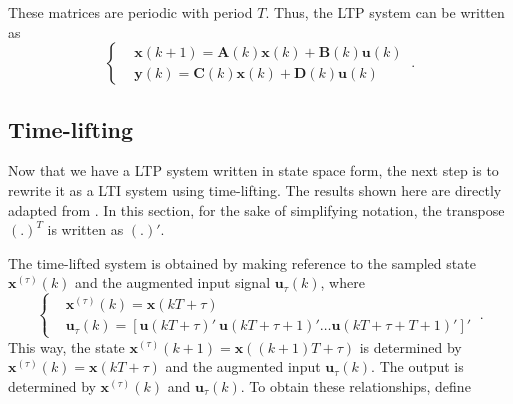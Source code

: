 These matrices are periodic with period $T$. Thus, the LTP system can be written as
\begin{equation} \label{eq:4.4}
\begin{cases}
      &\boldsymbol{x}(k+1)=\boldsymbol{A}(k)\boldsymbol{x}(k)+\boldsymbol{B}(k)\boldsymbol{u}(k)\\
      &\boldsymbol{y}(k)=\boldsymbol{C}(k)\boldsymbol{x}(k)+\boldsymbol{D}(k)\boldsymbol{u}(k)
\end{cases} \ .
\end{equation}



\subsection{Time-lifting}

Now that we have a LTP system written in state space form, the next step is to rewrite it as a LTI system using time-lifting. The results shown here are directly adapted from \cite{bittanti2009periodic}. In this section, for the sake of simplifying notation, the transpose $(.)^T$ is written as $(.)'$.
\par
The time-lifted system is obtained by making reference to the sampled state $\boldsymbol{x}^{(\tau)}(k)$ and the augmented input signal $\boldsymbol{u}_{\tau}(k)$, where
\begin{equation} \label{eq:4.5}
\begin{cases}
    &\boldsymbol{x}^{(\tau)}(k)=\boldsymbol{x}(kT+\tau)\\
    &\boldsymbol{u}_{\tau}(k)=[\boldsymbol{u}(kT+\tau)' \ \boldsymbol{u}(kT+\tau+1)' \dots \boldsymbol{u}(kT+\tau+T+1)']'
\end{cases} \ .
\end{equation}
This way, the state $\boldsymbol{x}^{(\tau)}(k+1)=\boldsymbol{x}((k+1)T+\tau)$ is determined by $\boldsymbol{x}^{(\tau)}(k)=\boldsymbol{x}(kT+\tau)$ and the augmented input $\boldsymbol{u}_{\tau}(k)$. The output is determined by $\boldsymbol{x}^{(\tau)}(k)$ and $\boldsymbol{u}_{\tau}(k)$. To obtain these relationships, define
